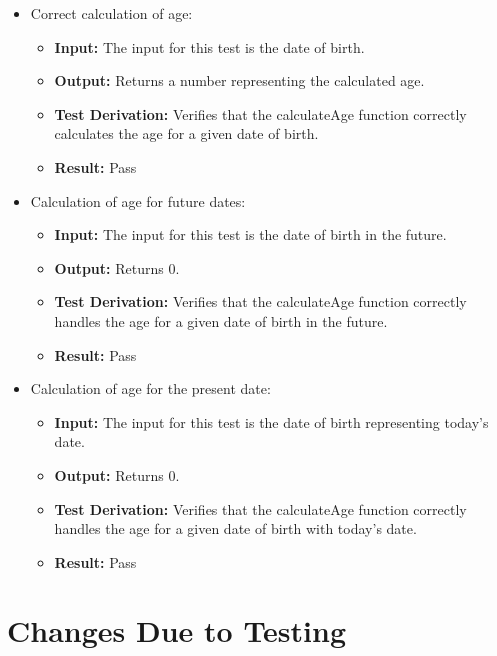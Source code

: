 \documentclass[12pt, titlepage]{article}
\begin{document}
\begin{enumerate}
\begin{itemize}
    \item Correct calculation of age:

    \begin{itemize}
      \item \textbf{Input:} The input for this test is the date of birth.    
      \item \textbf{Output:} Returns a number representing the calculated age.
      \item \textbf{Test Derivation:} Verifies that the calculateAge function correctly calculates the age for a given date of birth.
      \item \textbf{Result:} Pass
    \end{itemize}

    \item Calculation of age for future dates:

    \begin{itemize}
      \item \textbf{Input:} The input for this test is the date of birth in the future.    
      \item \textbf{Output:} Returns 0.
      \item \textbf{Test Derivation:} Verifies that the calculateAge function correctly handles the age for a given date of birth in the future.
      \item \textbf{Result:} Pass
    \end{itemize}

    \item Calculation of age for the present date:

    \begin{itemize}
      \item \textbf{Input:} The input for this test is the date of birth representing today's date.    
      \item \textbf{Output:} Returns 0.
      \item \textbf{Test Derivation:} Verifies that the calculateAge function correctly handles the age for a given date of birth with today's date.
      \item \textbf{Result:} Pass
    \end{itemize}
  \end{itemize}
\end{enumerate}


\section{Changes Due to Testing}
\end{document}
